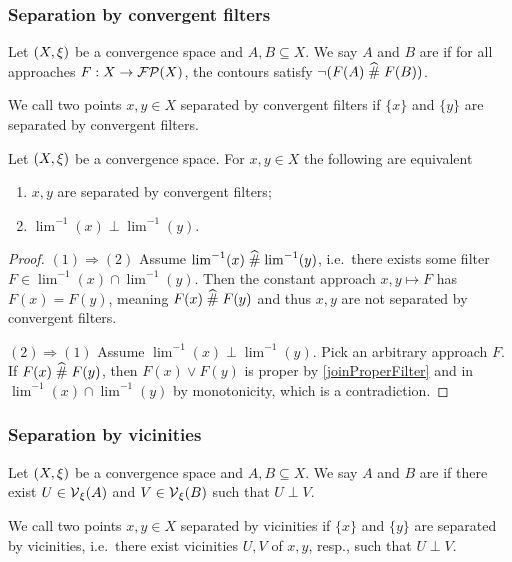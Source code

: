 \subsubsection{Separation by convergent filters}
\begin{definition}
Let $\left( X,\xi \right)$ be a convergence space and $A,B\subseteq X$. We say $A$ and $B$ are  if for all approaches $F:X\to \operatorname{\mathcal{FP}}(X)$, the contours satisfy $\neg(F(A)\mathrel{\widehat{\#}} F(B))$.

We call two points $x,y\in X$ separated by convergent filters if $\{x\}$ and $\{y\}$ are separated by convergent filters.
\end{definition}

\begin{lemma} \label{pointsSeparatedConvergentFilters}
Let $\left( X,\xi \right)$ be a convergence space. For $x,y\in X$ the following are equivalent
\begin{enumerate}
\item $x,y$ are separated by convergent filters;
\item $\lim^{-1}(x)\perp \lim^{-1}(y)$.
\end{enumerate}
\end{lemma}
\begin{proof}
$(1) \Rightarrow (2)$ Assume $\lim^{-1}(x)\mathrel{\widehat{\#}} \lim^{-1}(y)$, i.e.\ there exists some filter $F\in \lim^{-1}(x)\cap \lim^{-1}(y)$. Then the constant approach $x,y\mapsto F$ has $F(x) = F(y)$, meaning $F(x)\mathrel{\widehat{\#}} F(y)$ and thus $x,y$ are not separated by convergent filters.

$(2) \Rightarrow (1)$ Assume $\lim^{-1}(x)\perp \lim^{-1}(y)$. Pick an arbitrary approach $F$. If $F(x)\mathrel{\widehat{\#}} F(y)$, then $F(x)\vee F(y)$ is proper by \ref{joinProperFilter} and in $\lim^{-1}(x)\cap \lim^{-1}(y)$ by monotonicity, which is a contradiction.
\end{proof}


\subsubsection{Separation by vicinities}
\begin{definition}
Let $\left( X,\xi \right)$ be a convergence space and $A,B\subseteq X$. We say $A$ and $B$ are  if there exist $U\in \operatorname{\mathcal{V}}_\xi(A)$ and $V\in\operatorname{\mathcal{V}}_\xi(B)$ such that $U\perp V$.

We call two points $x,y\in X$ separated by vicinities if $\{x\}$ and $\{y\}$ are separated by vicinities, i.e.\ there exist vicinities $U,V$ of $x,y$, resp., such that $U\perp V$.
\end{definition}

